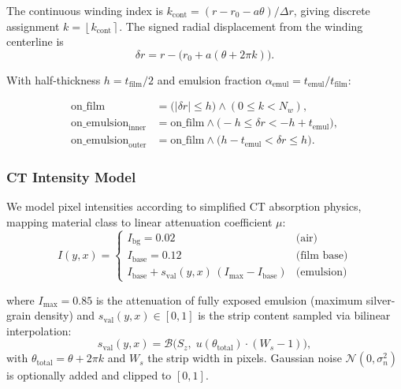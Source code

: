 \documentclass[11pt,a4paper]{article}
\newcommand{\round}[1]{\left\lfloor #1 \right\rceil}
\begin{document}
The continuous winding index is $k_{\text{cont}} = (r - r_0 - a\theta)/\Delta r$, giving discrete assignment $k = \round{k_{\text{cont}}}$. The signed radial displacement from the winding centerline is
\begin{equation}
    \delta r = r - \bigl(r_0 + a(\theta + 2\pi k)\bigr).
\end{equation}

With half-thickness $h = t_{\text{film}}/2$ and emulsion fraction $\alpha_{\text{emul}} = t_{\text{emul}}/t_{\text{film}}$:

\begin{align}
    \text{on\_film} &= \bigl(|\delta r| \leq h\bigr) \wedge (0 \leq k < N_w), \\
    \text{on\_emulsion}_{\text{inner}} &= \text{on\_film} \wedge \bigl(-h \leq \delta r < {-h + t_{\text{emul}}}\bigr), \\
    \text{on\_emulsion}_{\text{outer}} &= \text{on\_film} \wedge \bigl(h - t_{\text{emul}} < \delta r \leq h\bigr).
\end{align}

\subsubsection{CT Intensity Model}

We model pixel intensities according to simplified CT absorption physics, mapping material class to linear attenuation coefficient $\mu$:
\begin{equation}
    I(y,x) = \begin{cases}
        I_{\text{bg}} = 0.02 & \text{(air)} \\
        I_{\text{base}} = 0.12 & \text{(film base)} \\
        I_{\text{base}} + s_{\text{val}}(y,x)\,(I_{\max} - I_{\text{base}}) & \text{(emulsion)}
    \end{cases}
    \label{eq:ct_intensity}
\end{equation}

where $I_{\max} = 0.85$ is the attenuation of fully exposed emulsion (maximum silver-grain density) and $s_{\text{val}}(y,x) \in [0,1]$ is the strip content sampled via bilinear interpolation:
\begin{equation}
    s_{\text{val}}(y,x) = \mathcal{B}\bigl(S_z,\; u(\theta_{\text{total}})\cdot (W_s - 1)\bigr),
\end{equation}
with $\theta_{\text{total}} = \theta + 2\pi k$ and $W_s$ the strip width in pixels. Gaussian noise $\mathcal{N}(0, \sigma_n^2)$ is optionally added and clipped to $[0,1]$.
\end{document}
